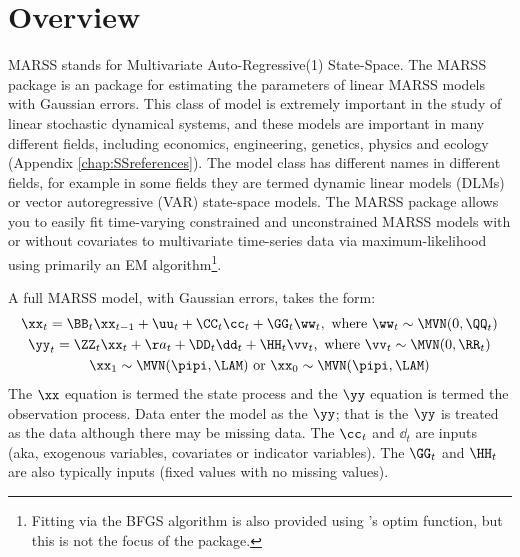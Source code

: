 \chapter{Overview}
\label{chap:intro}

MARSS stands for Multivariate Auto-Regressive(1) State-Space. The MARSS package is an \R package for estimating the parameters of linear MARSS models with Gaussian errors.  This class of model is extremely important in the study of linear stochastic dynamical systems, and these models are important in many different fields, including economics, engineering, genetics, physics and ecology (Appendix \ref{chap:SSreferences}).  The model class has different names in different fields, for example in some fields they are termed dynamic linear models (DLMs) or vector autoregressive (VAR) state-space models.  The MARSS package allows you to easily fit time-varying constrained and unconstrained MARSS models with or without covariates to multivariate time-series data via maximum-likelihood using primarily an EM algorithm\footnote{Fitting via the BFGS algorithm is also provided using \R's optim function, but this is not the focus of the package.}.

A full MARSS model, with Gaussian errors, takes the form:
\begin{subequations}\label{eqn:marss}
\begin{gather}
\xx_t = \BB_t\xx_{t-1} + \uu_t + \CC_t\cc_t + \GG_t\ww_t, \text{ where } \ww_t \sim \MVN(0,\QQ_t) \label{eqn:marssx}\\
\yy_t = \ZZ_t\xx_t + \aa_t + \DD_t\dd_t + \HH_t\vv_t, \text{ where } \vv_t \sim \MVN(0,\RR_t) \label{eqn:marssy}\\
\xx_1 \sim \MVN(\pipi,\LAM) \text{ or } \xx_0 \sim \MVN(\pipi,\LAM)\label{eqn:marssx1}
\end{gather}
\end{subequations}
The $\xx$ equation is termed the state process and the $\yy$ equation is termed the observation process.  Data enter the model as the $\yy$; that is the $\yy$ is treated as the data although there may be missing data.  The $\cc_t$ and $\dd_t$ are inputs (aka, exogenous variables, covariates or indicator variables).  The $\GG_t$ and $\HH_t$ are also typically inputs (fixed values with no missing values).

